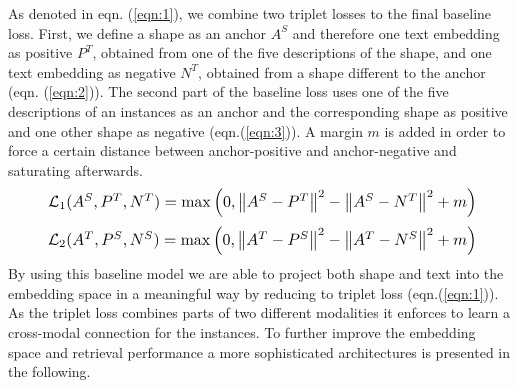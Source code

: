 \documentclass[10pt,twocolumn,letterpaper]{article}
\begin{document}
As denoted in eqn. (\ref{eqn:1}), we combine two triplet losses to the final baseline loss. First, we define a shape as an anchor $A^S$ and therefore one text embedding as positive $P^T$, obtained from one of the five descriptions of the shape, and one text embedding as negative $N^T$, obtained from a shape different to the anchor (eqn. (\ref{eqn:2})). The second part of the baseline loss uses one of the five descriptions of an instances as an anchor and the corresponding shape as positive and one other shape as negative (eqn.(\ref{eqn:3})). A margin $m$ is added in order to force a certain distance between anchor-positive and anchor-negative and saturating afterwards. 
\begin{equation}
	\label{eqn:2}
	\resizebox{.9 \linewidth}{!}
	{ $
	\mathcal{L}_1(A^S, P^T, N^T) = \max \left( 0, \left\Vert A^S - P^T\right\Vert^2 - \left\Vert A^S - N^T\right\Vert^2 +m \right) $}
\end{equation}
\begin{equation}
\label{eqn:3}
\resizebox{.9 \linewidth}{!}
{ $
	\mathcal{L}_2(A^T, P^S, N^S) = \max \left( 0, \left\Vert A^T - P^S\right\Vert^2 - \left\Vert A^T - N^S\right\Vert^2 +m \right) $}
\end{equation}
By using this baseline model we are able to project both shape and text into the embedding space in a meaningful way by reducing to triplet loss (eqn.(\ref{eqn:1})). As the triplet loss combines parts of two different modalities it enforces to learn a cross-modal connection for the instances. To further improve the embedding space and retrieval performance a more sophisticated architectures is presented in the following.
\end{document}
